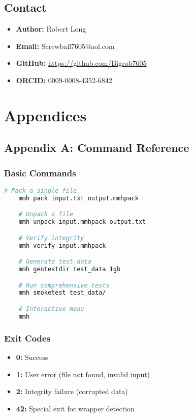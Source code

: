 \documentclass[11pt,a4paper]{article}
\begin{document}
	\subsection{Contact}
	\begin{itemize}
		\item \textbf{Author:} Robert Long
		\item \textbf{Email:} Screwball7605@aol.com
		\item \textbf{GitHub:} \url{https://github.com/Bigrob7605}
		\item \textbf{ORCID:} 0009-0008-4352-6842
	\end{itemize}

	\section{Appendices}
	\label{sec:appendices}

	\subsection{Appendix A: Command Reference}

	\subsubsection{Basic Commands}
	\begin{lstlisting}[language=bash]
	# Pack a single file
	mmh pack input.txt output.mmhpack

	# Unpack a file
	mmh unpack input.mmhpack output.txt

	# Verify integrity
	mmh verify input.mmhpack

	# Generate test data
	mmh gentestdir test_data 1gb

	# Run comprehensive tests
	mmh smoketest test_data/

	# Interactive menu
	mmh
	\end{lstlisting}

	\subsubsection{Exit Codes}
	\begin{itemize}
		\item \textbf{0:} Success
		\item \textbf{1:} User error (file not found, invalid input)
		\item \textbf{2:} Integrity failure (corrupted data)
		\item \textbf{42:} Special exit for wrapper detection
	\end{itemize}
\end{document}
